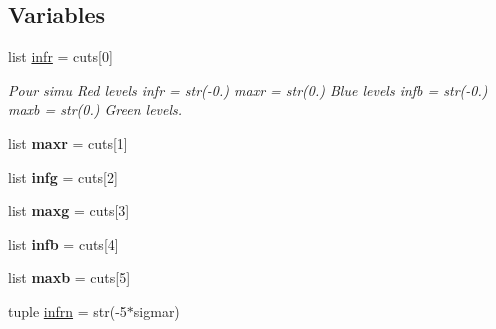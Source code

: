 \subsection*{Variables}
\begin{DoxyCompactItemize}
\item 
list \hyperlink{namespace_mu_s_c_a_de_t_1_1colour__subtraction_afb87ac62289e56dd4a37691397e81eaa}{infr} = cuts\mbox{[}0\mbox{]}
\begin{DoxyCompactList}\small\item\em Pour simu Red levels infr = str(-\/0.) maxr = str(0.) Blue levels infb = str(-\/0.) maxb = str(0.) Green levels. \end{DoxyCompactList}\item 
\hypertarget{namespace_mu_s_c_a_de_t_1_1colour__subtraction_a5f2d11c5411461df8a445e9da66f7b72}{}list {\bfseries maxr} = cuts\mbox{[}1\mbox{]}\label{namespace_mu_s_c_a_de_t_1_1colour__subtraction_a5f2d11c5411461df8a445e9da66f7b72}

\item 
\hypertarget{namespace_mu_s_c_a_de_t_1_1colour__subtraction_a9ca7630a16827eca29e94c1eb5022bac}{}list {\bfseries infg} = cuts\mbox{[}2\mbox{]}\label{namespace_mu_s_c_a_de_t_1_1colour__subtraction_a9ca7630a16827eca29e94c1eb5022bac}

\item 
\hypertarget{namespace_mu_s_c_a_de_t_1_1colour__subtraction_a2ef8443086c90877d9cd5ad2a84a4604}{}list {\bfseries maxg} = cuts\mbox{[}3\mbox{]}\label{namespace_mu_s_c_a_de_t_1_1colour__subtraction_a2ef8443086c90877d9cd5ad2a84a4604}

\item 
\hypertarget{namespace_mu_s_c_a_de_t_1_1colour__subtraction_aabd93b75acc532151cd5859c448e40ed}{}list {\bfseries infb} = cuts\mbox{[}4\mbox{]}\label{namespace_mu_s_c_a_de_t_1_1colour__subtraction_aabd93b75acc532151cd5859c448e40ed}

\item 
\hypertarget{namespace_mu_s_c_a_de_t_1_1colour__subtraction_ae377c1b2929b505e1abaff277b7efb1c}{}list {\bfseries maxb} = cuts\mbox{[}5\mbox{]}\label{namespace_mu_s_c_a_de_t_1_1colour__subtraction_ae377c1b2929b505e1abaff277b7efb1c}

\item 
\hypertarget{namespace_mu_s_c_a_de_t_1_1colour__subtraction_a591a5b3b9ba7706645fd09c1c7c40f36}{}tuple \hyperlink{namespace_mu_s_c_a_de_t_1_1colour__subtraction_a591a5b3b9ba7706645fd09c1c7c40f36}{infrn} = str(-\/5$\ast$sigmar)\label{namespace_mu_s_c_a_de_t_1_1colour__subtraction_a591a5b3b9ba7706645fd09c1c7c40f36}


\end{DoxyCompactItemize}
